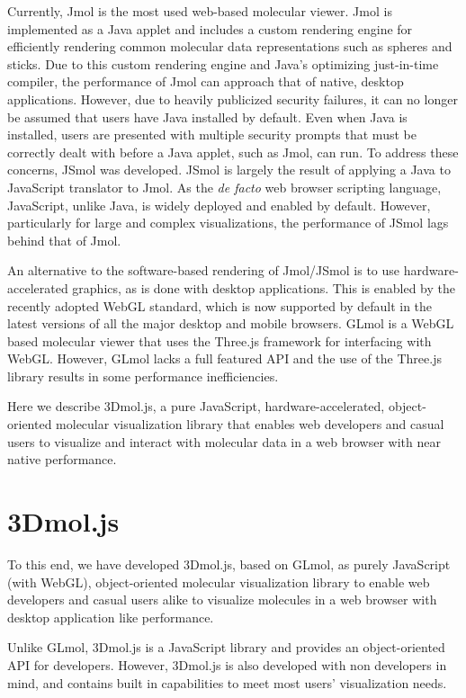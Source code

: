 \documentclass[]{bioinfo}
\begin{document}
Currently, Jmol\cite{jmol,hanson2010jmol} is the most used web-based molecular viewer. Jmol is implemented as a Java applet and includes a custom rendering engine for efficiently rendering common molecular data representations such as spheres and sticks.  Due to this custom rendering engine and Java's optimizing just-in-time compiler, the performance of Jmol can approach that of native, desktop applications.  However, due to heavily publicized security failures, it can no longer be assumed that users have Java installed by default\cite{doomedjava}.  Even when Java is installed, users are presented with multiple security prompts that must be correctly dealt with before a Java applet, such as Jmol, can run.
To address these concerns, JSmol\cite{hanson2013jsmol} was developed. JSmol is largely the result of applying a Java to JavaScript translator to Jmol. As the \textit{de facto} web browser scripting language, JavaScript, unlike Java, is widely deployed and enabled by default.  However, particularly for large and complex visualizations, the performance of JSmol lags behind that of Jmol.

An alternative to the software-based rendering of Jmol/JSmol is to use hardware-accelerated graphics, as is done with desktop applications.  This is enabled by the recently adopted WebGL\cite{webgl} standard, which is now supported by default in the latest versions of all the major desktop and mobile browsers. GLmol\cite{glmol} is a WebGL based molecular viewer that uses the Three.js\cite{threejs} framework for interfacing with WebGL.  However, GLmol lacks a full featured API and the use of the Three.js library results in some performance inefficiencies.

Here we describe 3Dmol.js, a pure JavaScript, hardware-accelerated, object-oriented molecular visualization library that enables web developers and casual users to visualize and interact with molecular data in a web browser with near native performance.

\section{3Dmol.js}
To this end, we have developed 3Dmol.js, based on GLmol, as purely JavaScript (with WebGL), object-oriented molecular visualization library to enable web developers and casual users alike to visualize molecules in a web browser with desktop application like performance.  

Unlike GLmol, 3Dmol.js is a JavaScript library and provides an object-oriented API for developers.  However, 3Dmol.js is also developed with non developers in mind, and contains built in capabilities to meet most users' visualization needs.
\end{document}
